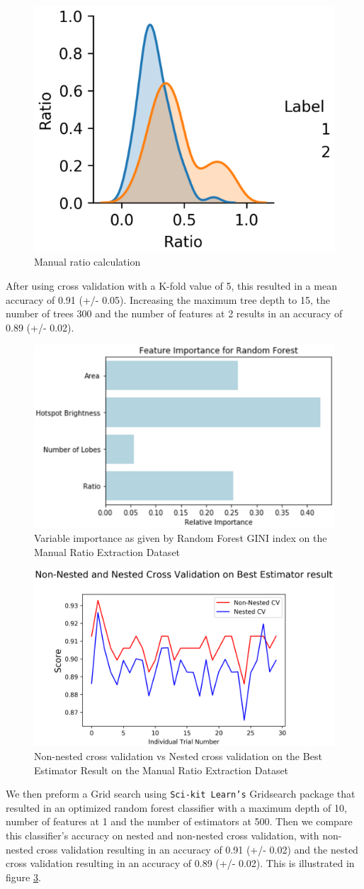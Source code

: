 \documentclass[conference]{IEEEtran}
\begin{document}
\begin{figure}[ht]
    \centering
    \includegraphics[width=0.3 \textwidth]{EPS/ratio.eps}
    \caption{Manual ratio calculation}
    \label{fig:ratio_plot}
\end{figure}

After using cross validation with a K-fold value of 5, this resulted in a mean accuracy of 0.91 (+/- 0.05). Increasing the maximum tree depth to 15, the number of trees 300 and the number of features at 2 results in an accuracy of 0.89 (+/- 0.02).

\begin{figure}[ht]
    \centering
    \includegraphics[width=0.5 \textwidth]{EPS/feature_import.eps}
    \caption{Variable importance as given by Random Forest GINI index on the Manual Ratio Extraction Dataset}
    \label{fig:gini}
\end{figure}

\begin{figure}[ht]
    \centering
    \includegraphics[width=0.5 \textwidth]{EPS/ee.eps}
    \caption{Non-nested cross validation vs Nested cross validation on the Best Estimator Result on the Manual Ratio Extraction Dataset}
    \label{fig:nested}
\end{figure}

We then preform a Grid search using \texttt{Sci-kit Learn's} Gridsearch package that resulted in an optimized random forest classifier with a maximum depth of 10, number of features at 1 and the number of estimators at 500. Then we compare this classifier's accuracy on nested and non-nested cross validation, with non-nested cross validation resulting in an accuracy of 0.91 (+/- 0.02) and the nested cross validation resulting in an accuracy of 0.89 (+/- 0.02). This is illustrated in figure \ref{fig:nested}.
\end{document}
